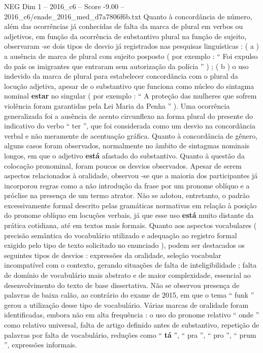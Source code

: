 \begin{textsample}{NEG Dim 1 – 2016\_c6 – Score -9.00 – 2016\_c6/enade\_2016\_med\_d7a7806f6b.txt}
Quanto à concordância de número, além das ocorrências já conhecidas de falta da marca de plural em verbos ou adjetivos, em função da ocorrência de substantivo plural na função de sujeito, observaram -se dois tipos de desvio já registrados nas pesquisas linguísticas : ( a ) a ausência de marca de plural com sujeito posposto ( por exemplo : “ Foi expulso do país os imigrantes que entraram sem autorização da polícia ” ) ; ( b ) o uso indevido da marca de plural para estabelecer concordância com o plural da locução adjetiva, apesar de o substantivo que funciona como núcleo do sintagma nominal \textbf{estar} no singular ( por exemplo : “ A proteção das mulheres que sofrem violência foram garantidas pela Lei Maria da Penha ” ).
Uma ocorrência generalizada foi a ausência de acento circunflexo na forma plural do presente do indicativo do verbo “ ter ”, que foi considerada como um desvio na concordância verbal e não meramente de acentuação gráfica.
Quanto à concordância de gênero, alguns casos foram observados, normalmente no âmbito de sintagmas nominais longos, em que o adjetivo \textbf{está} afastado do substantivo.
Quanto à questão da colocação pronominal, foram poucos os desvios observados.
Apesar de serem aspectos relacionados à oralidade, observou -se que a maioria dos participantes já incorporou regras como a não introdução da frase por um pronome oblíquo e a próclise na presença de um termo atrator.
Não se adotou, entretanto, o padrão excessivamente formal descrito pelas gramáticas normativas em relação à posição do pronome oblíquo em locuções verbais, já que esse uso \textbf{está} muito distante da prática cotidiana, até em textos mais formais.
Quanto aos aspectos vocabulares ( precisão semântica do vocabulário utilizado e adequação ao registro formal exigido pelo tipo de texto solicitado no enunciado ), podem ser destacados os seguintes tipos de desvios : expressões da oralidade, seleção vocabular incompatível com o contexto, gerando situações de falta de inteligibilidade ; falta de domínio de vocabulário mais abstrato e de maior complexidade, essencial ao desenvolvimento do texto de base dissertativa.
Não se observou presença de palavras de baixa calão, ao contrário do exame de 2015, em que o tema “ funk ” gerou a utilização desse tipo de vocabulário.
Várias marcas de oralidade foram identificadas, embora não em alta frequência : o uso do pronome relativo “ onde ” como relativo universal, falta de artigo definido antes de substantivo, repetição de palavras por falta de vocabulário, reduções como “ \textbf{tá} ”, “ pra ”, “ pro ”, “ prum ”, expressões informais.

\end{textsample}
